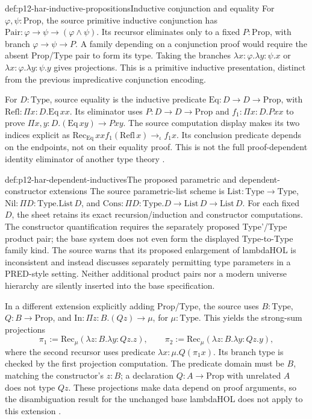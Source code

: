 \begin{hbdefinition}{def:p12-har-inductive-propositions}{Inductive conjunction and equality}
For \(\varphi,\psi:\mathrm{Prop}\), the source primitive
inductive conjunction has
\(\mathrm{Pair}:\varphi\to\psi\to(\varphi\land\psi)\).
Its recursor eliminates only to a fixed \(P:\mathrm{Prop}\),
with branch \(\varphi\to\psi\to P\). A family depending
on a conjunction proof would require the absent Prop/Type pair to form
its type. Taking the branches \(\lambda x:\varphi.\lambda y:\psi.x\)
or \(\lambda x:\varphi.\lambda y:\psi.y\) gives projections.
This is a primitive inductive presentation, distinct from the previous
impredicative conjunction encoding.

For \(D:\mathrm{Type}\), source equality is the inductive predicate
\(\mathrm{Eq}:D\to D\to\mathrm{Prop}\), with
\(\mathrm{Refl}:\Pi x:D.\mathrm{Eq}\,x x\).
Its eliminator uses \(P:D\to D\to\mathrm{Prop}\) and
\(f_1:\Pi x:D.Pxx\) to prove
\(\Pi x,y:D.(\mathrm{Eq}\,xy)\to Pxy\).
The source computation display makes its two indices explicit as
\(\mathrm{Rec}_{\mathrm{Eq}}\,x x f_1(\mathrm{Refl}\,x)
\to_\iota f_1x\). Its conclusion predicate depends on the endpoints,
not on their equality proof. This is not the full proof-dependent identity
eliminator of another type theory
\cite[pp.~1209--1211]{BarendregtGeuvers2001}.
\end{hbdefinition}

\begin{hbdefinition}{def:p12-har-dependent-inductives}{The proposed parametric and dependent-constructor extensions}
The source parametric-list scheme is
\(\mathrm{List}:\mathrm{Type}\to\mathrm{Type}\),
\(\mathrm{Nil}:\Pi D:\mathrm{Type}.\mathrm{List}\,D\), and
\(\mathrm{Cons}:\Pi D:\mathrm{Type}.
D\to\mathrm{List}\,D\to\mathrm{List}\,D\).
For each fixed \(D\), the sheet retains its exact recursion/induction
and constructor computations. The constructor quantification requires
the separately proposed Type'/Type product pair; the base system does
not even form the displayed Type-to-Type family kind. The source warns
that its proposed enlargement of lambdaHOL is inconsistent and instead
discusses separately permitting type parameters in a PRED-style setting.
Neither additional product pairs nor a modern universe hierarchy are
silently inserted into the base specification.

In a different extension explicitly adding Prop/Type, the source uses
\(B:\mathrm{Type}\), \(Q:B\to\mathrm{Prop}\), and
\(\mathrm{In}:\Pi z:B.(Qz)\to\mu\), for
\(\mu:\mathrm{Type}\). This yields the strong-sum projections
\[
 \pi_1:=\mathrm{Rec}_\mu(\lambda z:B.\lambda y:Qz.z),
 \qquad
 \pi_2:=\mathrm{Rec}_\mu(\lambda z:B.\lambda y:Qz.y),
\]
where the second recursor uses predicate
\(\lambda x:\mu.Q(\pi_1x)\). Its branch type is checked by
the first projection computation. The predicate domain must be \(B\),
matching the constructor's \(z:B\); a declaration \(Q:A\to\mathrm{Prop}\)
with unrelated \(A\) does not type \(Qz\).
These projections make data depend on proof arguments, so the
disambiguation result for the unchanged base lambdaHOL does not apply
to this extension \cite[pp.~1210--1211]{BarendregtGeuvers2001}.
\end{hbdefinition}

